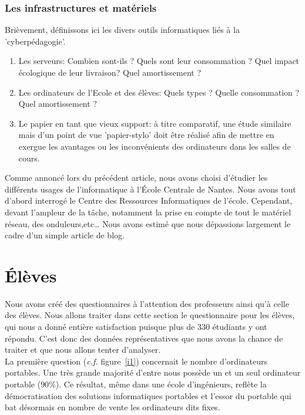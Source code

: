 \documentclass[a4paper,11pt,french]{article}
\begin{document}
\subsubsection{Les infrastructures et matériels}
Brièvement, définissons ici les divers outils informatiques liés à la 'cyberpédagogie'. 
\begin{enumerate}
\item Les serveurs: Combien sont-ils ? Quels sont leur consommation ? Quel impact écologique de leur livraison? Quel amortissement ?
\item Les ordinateurs de l'Ecole et des élèves: Quels types ? Quelle consommation ? Quel amortissement ?
\item Le papier en tant que vieux support: à titre comparatif, une étude similaire mais d'un point de vue 'papier-stylo' doit être réalisé afin de mettre en exergue les avantages ou les inconvénients des ordinateurs dans les salles de cours.
\end{enumerate}


Comme annoncé lors du précédent article, nous avons choisi d’étudier les différents usages de l’informatique à l’École Centrale de Nantes. Nous avons tout d’abord interrogé le Centre des Ressources Informatiques de l’école. Cependant, devant l’ampleur de la tâche, notamment la prise en compte de tout le matériel réseau, des onduleurs,etc… Nous avons estimé que nous dépassions largement le cadre d’un simple article de blog.

\section{\'Elèves}
Nous avons créé des questionnaires à l’attention des professeurs ainsi qu’à celle des élèves. Nous allons traiter dans cette section le questionnaire pour les élèves, qui nous a donné entière satisfaction puisque plus de 330 étudiants y ont répondu. C’est donc des données représentatives que nous avons la chance de traiter et que nous allons tenter d’analyser.\\

La première question (\textit{c.f.} figure~\vref{i1}) concernait le nombre d’ordinateurs portables. Une très grande majorité d’entre nous possède un et un seul ordinateur portable ($90\%$). Ce résultat, même dans une école d’ingénieurs, reflète la démocratisation des solutions informatiques portables et l’essor du portable qui bat désormais en nombre de vente les ordinateurs dits fixes.\\
\end{document}
